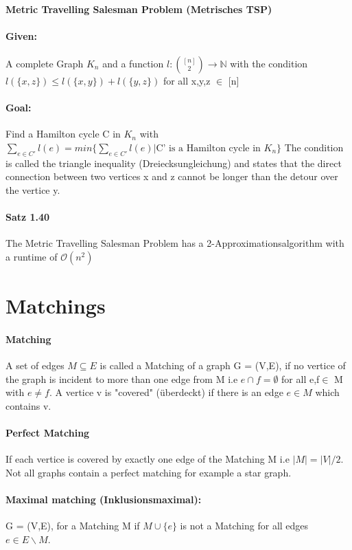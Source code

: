 \documentclass[8pt]{extreport}
\begin{document}
\paragraph{Metric Travelling Salesman Problem (Metrisches TSP)}
\paragraph{Given:} A complete Graph $K_{n}$ and a function $\mathit{l} : \binom{[n]}{2} \rightarrow \mathbb{N}$ with the condition $\mathit{l}(\{x,z\}) \leq \mathit{l}(\{x,y\}) + \mathit{l}(\{y,z\})$ for all x,y,z $\in$ [n]
\paragraph{Goal:} Find a Hamilton cycle C in $K_{n}$ with  $\sum_{e\in C'} \mathit{l}(e) = min\{\sum_{e\in C'} \mathit{l}(e) | \text{C' is a Hamilton cycle in } K_{n}\}$ The condition is called the triangle inequality (Dreiecksungleichung) and states that the direct connection between two vertices x and z cannot be longer than the detour over the vertice y.
\paragraph{Satz 1.40} The Metric Travelling Salesman Problem has a 2-Approximationsalgorithm with a runtime of $\mathcal{O}(n^2)$
\section{Matchings}
\paragraph{Matching} A set of edges $M\subseteq E$ is called a Matching of a graph G = (V,E), if no vertice of the graph is incident to more than one edge from M i.e $e\cap f = \emptyset$ for all e,f$\in$ M with $e\neq f$. A vertice v is "covered" (überdeckt) if there is an edge $e\in M$ which contains v.
\paragraph{Perfect Matching} If each vertice is covered by exactly one edge of the Matching M i.e $|M| = |V|/2$. Not all graphs contain a perfect matching for example a star graph.
\paragraph{Maximal matching (Inklusionsmaximal):} G = (V,E), for a Matching M if $M\cup \{e\}$ is not a Matching for all edges $e\in E\backslash M$.
\end{document}

